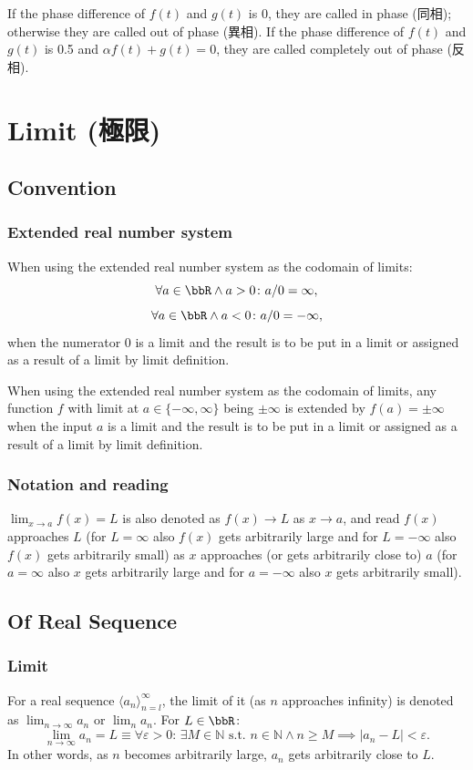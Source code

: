 \documentclass[a4paper,12pt]{report}
\begin{document}
If the phase difference of $f(t)$ and $g(t)$ is 0, they are called in phase (同相); otherwise they are called out of phase (異相). If the phase difference of $f(t)$ and $g(t)$ is 0.5 and $\alpha f(t)+g(t)=0$, they are called completely out of phase (反相).



\section{Limit (極限)}
\subsection{Convention}
\subsubsection{Extended real number system}
When using the extended real number system as the codomain of limits:
\[\forall a\in\bbR\land a>0\colon a/0=\infty,\]
\[\forall a\in\bbR\land a<0\colon a/0=-\infty,\]
when the numerator $0$ is a limit and the result is to be put in a limit or assigned as a result of a limit by limit definition.

When using the extended real number system as the codomain of limits, any function $f$ with limit at $a\in\{-\infty,\infty\}$ being $\pm\infty$ is extended by $f(a)=\pm\infty$ when the input $a$ is a limit and the result is to be put in a limit or assigned as a result of a limit by limit definition.
\subsubsection{Notation and reading}
$\lim_{x\to a}f(x)=L$ is also denoted as $f(x)\to L$ as $x\to a$, and read $f(x)$ approaches $L$ (for $L=\infty$ also $f(x)$ gets arbitrarily large and for $L=-\infty$ also $f(x)$ gets arbitrarily small) as $x$ approaches (or gets arbitrarily close to) $a$ (for $a=\infty$ also $x$ gets arbitrarily large and for $a=-\infty$ also $x$ gets arbitrarily small).
\subsection{Of Real Sequence}
\subsubsection{Limit}
For a real sequence \(\langle a_n\rangle_{n=l}^{\infty}\), the limit of it (as $n$ approaches infinity) is denoted as $\lim_{n \to \infty} a_n$ or $\lim_n a_n$. For $L\in\bbR$:
\[\lim_{n \to \infty} a_n = L \equiv \forall \varepsilon > 0:\, \exists M \in\mathbb{N}\text{\ s.t.\ } n\in\mathbb{N}\land n \geq M\implies |a_n - L| < \varepsilon.\]
In other words, as \(n\) becomes arbitrarily large, \(a_n\) gets arbitrarily close to \(L\).
\end{document}
